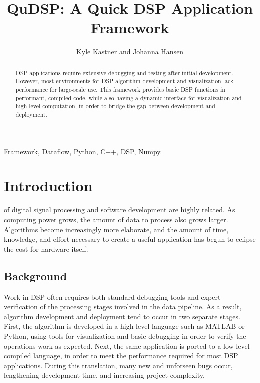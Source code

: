 \documentclass[journal]{IEEEtran}
\begin{document}
\title{QuDSP: A Quick DSP Application Framework}

\author{Kyle Kastner and Johanna Hansen}%

\maketitle

\begin{abstract}
DSP applications require extensive debugging and testing after initial development. However, most environments 
for DSP algorithm development and visualization lack performance for large-scale use.
This framework provides basic DSP functions in performant, compiled code, while also having a dynamic
interface for visualization and high-level computation, in order to bridge the gap between development and deployment. 
\end{abstract}

\begin{IEEEkeywords}
Framework, Dataflow, Python, C++, DSP, Numpy.
\end{IEEEkeywords}

\IEEEpeerreviewmaketitle
\section{Introduction}
 of digital signal processing and software development are highly related. As computing power
grows, the amount of data to process also grows larger. Algorithms become increasingly more elaborate, and the amount of time, knowledge,
and effort necessary to create a useful application has begun to eclipse the cost for hardware itself.

\subsection{Background}
Work in DSP often requires both standard debugging tools and expert verification of the processing stages involved 
in the data pipeline. As a result, algorithm development and deployment tend to occur in two separate stages.
First, the algorithm is developed in a high-level language such as MATLAB or Python, using tools for visualization 
and basic debugging in order to verify the operations work as expected. Next, the same application is ported to a low-level compiled
language, in order to meet the performance required for most DSP applications. During this translation, many new and
unforseen bugs occur, lengthening development time, and increasing project complexity. 
\end{document}
